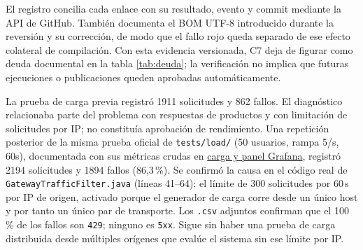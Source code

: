 \documentclass[12pt,a4paper]{article}
\begin{document}
El registro  concilia cada enlace con su resultado, evento y commit mediante la API de GitHub. También documenta el BOM UTF-8 introducido durante la reversión y su corrección, de modo que el fallo rojo queda separado de ese efecto colateral de compilación. Con esta evidencia versionada, C7 deja de figurar como deuda documental en la tabla \ref{tab:deuda}; la verificación no implica que futuras ejecuciones o publicaciones queden aprobadas automáticamente.

La prueba de carga previa registró 1911 solicitudes y 862 fallos. El diagnóstico relacionaba parte del problema con respuestas de productos y con limitación de solicitudes por IP; no constituía aprobación de rendimiento. Una repetición posterior de la misma prueba oficial de \texttt{tests/load/} (50 usuarios, rampa 5/s, 60s), documentada con sus métricas crudas en \href{https://github.com/JoseLozanoMorales/TiendaTech/blob/b690470163513c757dd51cb8d47677d09955fda8/docs/evidencias/paso10-item5-grafana-carga.md}{carga y panel Grafana}, registró 2194 solicitudes y 1894 fallos (86,3\,\%). Se confirmó la causa en el código real de \texttt{GatewayTrafficFilter.java} (líneas 41--64): el límite de 300 solicitudes por 60\,s por IP de origen, activado porque el generador de carga corre desde un único host y por tanto un único par de transporte. Los \texttt{.csv} adjuntos confirman que el 100\,\% de los fallos son \texttt{429}; ninguno es \texttt{5xx}. Sigue sin haber una prueba de carga distribuida desde múltiples orígenes que evalúe el sistema sin ese límite por IP.
\end{document}
